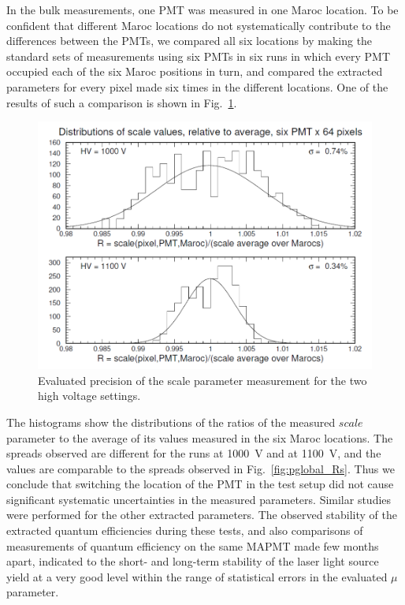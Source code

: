 In the bulk measurements, one PMT was measured in one Maroc location. To be confident that different Maroc locations do not systematically contribute to the differences between the PMTs, we compared all six locations by making the standard sets of measurements using six PMTs in six runs in which every PMT occupied each of the six Maroc positions in turn, and compared the extracted parameters for every pixel made six times in the different locations. One of the results of such a comparison is shown in Fig.~\ref{fig:R_scale_maroc_avg}. 
\begin{figure}[h!]
	\centering
	\includegraphics[width=0.98\linewidth, trim=0 10 15 10, clip]{figures/R_scale_maroc_avg.png}
	\caption{Evaluated precision of the scale parameter measurement for the two high voltage settings.}
	\label{fig:R_scale_maroc_avg}
\end{figure}
The histograms show the distributions of the ratios of the measured $scale$ parameter to the average of its values measured in the six Maroc locations. The spreads observed are different for the runs at 1000~V and at 1100~V, and the values are comparable to the spreads observed in Fig.~\ref{fig:pglobal_Rs}. Thus we conclude that switching the location of the PMT in the test setup did not cause significant systematic uncertainties in the measured parameters. Similar studies were performed for the other extracted parameters. The observed stability of the extracted quantum efficiencies during these tests, and also comparisons of measurements of quantum efficiency on the same MAPMT made few months apart, indicated to the short- and long-term stability of the laser light source yield at a very good level within the range of statistical errors in the evaluated $\mu$ parameter.  


